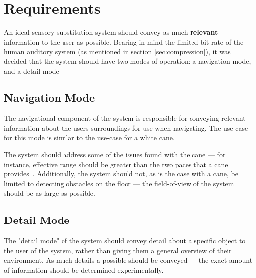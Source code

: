 \section{Requirements}
An ideal sensory substitution system should convey as much \textbf{relevant} information to the user as possible. Bearing in mind the limited bit-rate of the human auditory system (as mentioned in section \ref{sec:compression}), it was decided that the system should have two modes of operation: a navigation mode, and a detail mode

\subsection{Navigation Mode}
The navigational component of the system is responsible for conveying relevant information about the users surroundings for use when navigating. The use-case for this mode is similar to the use-case for a white cane.

The system should address some of the issues found with the cane --- for instance, effective range should be greater than the two paces that a cane provides~\cite{mobilityenhancement}. Additionally, the system should not, as is the case with a cane, be limited to detecting obstacles on the floor --- the field-of-view of the system should be as large as possible.

\subsection{Detail Mode}
The "detail mode" of the system should convey detail about a specific object to the user of the system, rather than giving them a general overview of their environment. As much details a possible should be conveyed --- the exact amount of information should be determined experimentally.
